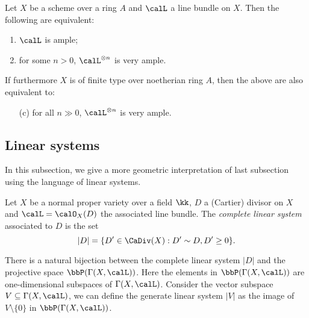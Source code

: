     \begin{theorem}\label{thm:ample_very_ample}
        Let \(X\) be a scheme over a ring \(A\) and \(\calL\) a line bundle on \(X\).
        Then the following are equivalent:
        \begin{enumerate}
            \item \(\calL\) is ample;
            \item for some \(n>0\), \(\calL^{\otimes n}\) is very ample.
        \end{enumerate}
        If furthermore \(X\) is of finite type over noetherian ring \(A\), then the above are also equivalent to:
        \begin{enumerate}
            \item[(c)] for all \(n \gg 0\), \(\calL^{\otimes n}\) is very ample.
        \end{enumerate}
    \end{theorem}

    \begin{proposition}\label{prop:tensor_with_ample_very_ample_and_bpf}
        
    \end{proposition}

\subsection{Linear systems}

    In this subsection, we give a more geometric interpretation of last subsection using the language of linear systems.

    \begin{definition}\label{def:complete_linear_system}
        Let \(X\) be a normal proper variety over a field \(\kk\), \(D\) a (Cartier) divisor on \(X\) and \(\calL=\calO_X(D)\) the associated line bundle.
        The \emph{complete linear system} associated to \(D\) is the set 
        \[ |D| = \{D'\in \CaDiv(X) : D'\sim D, D' \geq 0\}. \]
    \end{definition}

    There is a natural bijection between the complete linear system \(|D|\) and the projective space \(\bbP(\Gamma(X,\calL))\).
    Here the elements in \(\bbP(\Gamma(X,\calL))\) are one-dimensional subspaces of \(\Gamma(X,\calL)\).
    Consider the vector subspace \(V\subseteq \Gamma(X,\calL)\), we can define the generate linear system \(|V|\) as the image of \(V\setminus \{0\}\) in \(\bbP(\Gamma(X,\calL))\).

